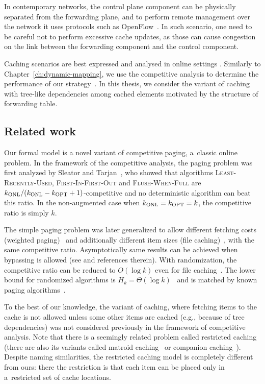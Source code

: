 In contemporary networks, the control plane component can be physically separated from the forwarding plane, and to perform remote management over the network it uses protocols such as OpenFlow~\cite{openflow}.
In such scenario, one need to be careful not to perform excessive cache updates, as those can cause congestion on the link between the forwarding component and the control component.

Caching scenarios are best expressed and analysed in online settings \cite{borodin-book}.
Similarly to Chapter~\ref{ch:dynamic-mapping}, we use the competitive analysis to determine the performance of our strategy~\cite{competitive-analysis}.
In this thesis, we consider the variant of caching with tree-like dependencies among cached elements motivated by the structure of forwarding table.

\subsection{Related work}

Our formal model is a novel variant of competitive paging, a~classic online
problem. In the framework of the competitive analysis, the paging problem was
first analyzed  by Sleator and Tarjan~\cite{competitive-analysis}, who showed
that algorithms \textsc{Least-Recently-Used}, \textsc{First-In-First-Out} and
\textsc{Flush-When-Full} are $k_\textnormal{ONL} / (k_\textnormal{ONL} - k_\textnormal{OPT} + 1)$-competitive 
and no deterministic algorithm can beat this ratio. In the non-augmented case
when $k_\textnormal{ONL} = k_\textnormal{OPT} = k$, the competitive ratio is simply $k$.

The simple paging problem was later generalized to allow different fetching
costs (weighted paging)~\cite{double-coverage,young-paging-greedy-dual} and
additionally different item sizes (file caching)~\cite{young-paging-landlord},
with the same competitive ratio. Asymptotically same results can be achieved
when bypassing is allowed (see \cite{caching-rejection-penalties,paging-irani}
and references therein). With randomization, the competitive ratio can be
reduced to $O(\log k)$ even for file caching~\cite{generalized-caching-optimal}. 
The lower bound for randomized algorithms is $H_k = 
\Theta(\log k)$~\cite{paging-mark} and is matched by known paging
algorithms~\cite{paging-optimal-easy,paging-optimal-difficult}.

To the best of our knowledge, the variant of caching, where fetching items to
the cache is not allowed unless some other items are cached (e.g., because of 
tree dependencies) was 
not considered previously in the framework of competitive analysis. Note that
there is a seemingly related problem called restricted
caching~\cite{restricted-caching} (there are also its variants called matroid
caching~\cite{matroid-caching} or companion caching~\cite{companion-caching}).
Despite naming similarities, the restricted caching model is completely
different from ours: there the restriction is that each item can be placed only in
a~restricted set of cache locations.


